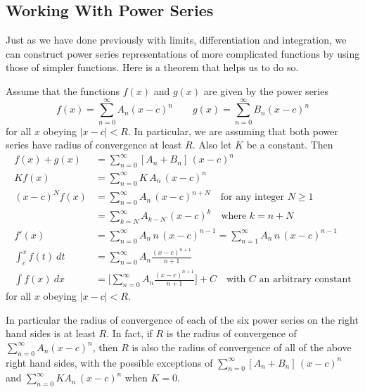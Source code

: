 \subsection{Working With Power Series}

Just as we have done previously with limits, differentiation
and integration, we can construct power series representations
of more complicated functions by using those of simpler functions.
Here is a theorem that helps us to do so.
\begin{theorem}\label{thm:SRpsops}
Assume that the functions $f(x)$ and $g(x)$ are given by the power series
\begin{equation*}
f(x) = \sum_{n=0}^\infty A_n (x-c)^n \qquad
g(x) = \sum_{n=0}^\infty B_n (x-c)^n
\end{equation*}
for all $x$ obeying $|x-c|<R$. In particular, we are assuming that both
power series have radius of convergence at least
$R$. Also let $K$ be a constant. Then
\begin{align*}
f(x)+g(x)   &= \sum_{n=0}^\infty [A_n+B_n]\, (x-c)^n \\
  Kf(x)     &= \sum_{n=0}^\infty K\, A_n\, (x-c)^n \\
(x-c)^Nf(x) &= \sum_{n=0}^\infty A_n\, (x-c)^{n+N}
                         \quad\text{for any integer $N\ge 1$}\\
           &= \sum_{k=N}^\infty A_{k-N}\, (x-c)^k
                         \quad\text{where $k=n+N$}\\
f'(x)     &= \sum_{n=0}^\infty A_n\, n\,(x-c)^{n-1}
           = \sum_{n=1}^\infty A_n\, n\,(x-c)^{n-1} \\
\int_c^x f(t)\ dt &= \sum_{n=0}^\infty A_n \frac{(x-c)^{n+1}}{n+1} \\
\int  f(x)\ dx &= \bigg[\sum_{n=0}^\infty A_n \frac{(x-c)^{n+1}}{n+1}\bigg]+C
\quad\text{with $C$ an arbitrary constant}
\end{align*}
for all $x$ obeying $|x-c|<R$.

In particular the radius of convergence of each of the six power
series on the right hand sides is at least $R$. In fact, if $R$
is the radius of convergence of $\sum\limits_{n=0}^\infty A_n (x-c)^n$,
then $R$ is also the radius of convergence of all of the above
right hand sides, with the possible exceptions of
$\sum\limits_{n=0}^\infty [A_n+B_n]\, (x-c)^n$ and
$\sum\limits_{n=0}^\infty KA_n\, (x-c)^n$ when $K=0$.
\end{theorem}

